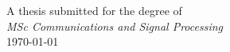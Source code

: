 \begin{titlepage}


{\large A thesis submitted for the degree of}\\[0.5cm]
{\large \emph{MSc Communications and Signal Processing}}\\[0.5cm]
{\large \today}\\[2cm] %

\vfill %

\end{titlepage} 